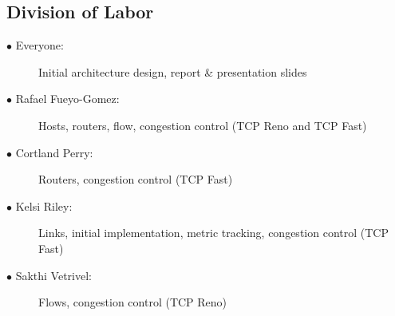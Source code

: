 \documentclass{article}
\begin{document}
\subsection{Division of Labor}

\begin{description}
    \item[$\bullet$ Everyone:] Initial architecture design, report \& presentation slides
	\item[$\bullet$ Rafael Fueyo-Gomez:] Hosts, routers, flow, congestion control (TCP Reno and TCP Fast)
	\item[$\bullet$ Cortland Perry:] Routers, congestion control (TCP Fast)
	\item[$\bullet$ Kelsi Riley:] Links, initial implementation, metric tracking, congestion control (TCP Fast)
	\item[$\bullet$ Sakthi Vetrivel:] Flows, congestion control (TCP Reno) 
\end{description}
\end{document}
